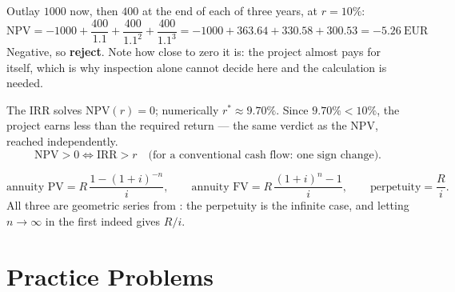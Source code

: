 \begin{worked}
Outlay $1000$ now, then $400$ at the end of each of three years, at $r=10\%$:
\[
  \mathrm{NPV}=-1000+\frac{400}{1.1}+\frac{400}{1.1^{2}}+\frac{400}{1.1^{3}}
  =-1000+363.64+330.58+300.53=\boxed{-5.26\ \text{EUR}}
\]
Negative, so \textbf{reject}. Note how close to zero it is: the project
almost pays for itself, which is why inspection alone cannot decide here
and the calculation is needed.

The IRR solves $\mathrm{NPV}(r)=0$; numerically $r^{*}\approx9.70\%$. Since
$9.70\%<10\%$, the project earns less than the required return --- the same
verdict as the NPV, reached independently.
\[
  \mathrm{NPV}>0 \iff \mathrm{IRR}>r
  \quad\text{(for a conventional cash flow: one sign change).}
\]

\[
  \text{annuity PV}=R\,\frac{1-(1+i)^{-n}}{i},
  \qquad
  \text{annuity FV}=R\,\frac{(1+i)^{n}-1}{i},
  \qquad
  \text{perpetuity}=\frac{R}{i} .
\]
All three are geometric series from : the perpetuity is the
infinite case, and letting $n\to\infty$ in the first indeed gives $R/i$.
\end{worked}

\section{Practice Problems}

